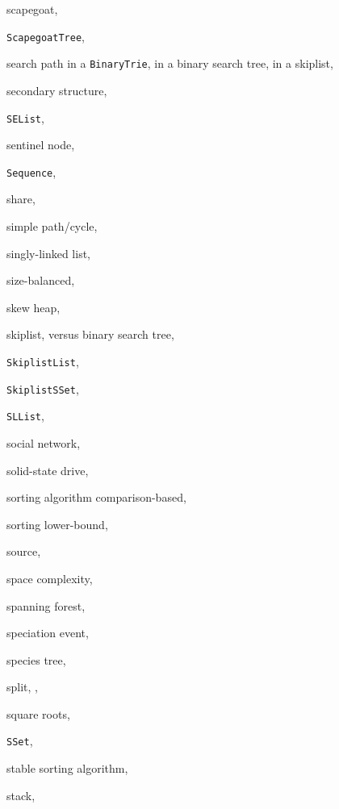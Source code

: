 \documentclass[10pt]{book}
\theoremstyle{plain}
\theoremstyle{definition}
\begin{document}
\begin{theindex}
  \item scapegoat, 
  \item \texttt{ScapegoatTree}, 
  \item search path
    \subitem in a \texttt{BinaryTrie}, 
    \subitem in a binary search tree, 
    \subitem in a skiplist, 
  \item secondary structure, 
  \item \texttt{SEList}, 
  \item sentinel node, 
  \item \texttt{Sequence}, 
  \item share, 
  \item simple path/cycle, 
  \item singly-linked list, 
  \item size-balanced, 
  \item skew heap, 
  \item skiplist, 
    \subitem versus binary search tree, 
  \item \texttt{SkiplistList}, 
  \item \texttt{SkiplistSSet}, 
  \item \texttt{SLList}, 
  \item social network, 
  \item solid-state drive, 
  \item sorting algorithm
    \subitem comparison-based, 
  \item sorting lower-bound, 
  \item source, 
  \item space complexity, 
  \item spanning forest, 
  \item speciation event, 
  \item species tree, 
  \item split, , 
  \item square roots, 
  \item \texttt{SSet}, 
  \item stable sorting algorithm, 
  \item stack, 

\end{theindex}
\end{document}
